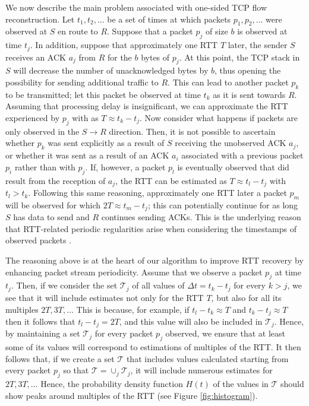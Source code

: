 %
%
We now describe the main problem associated with one-sided TCP flow reconstruction. Let $t_1, t_2, \ldots$ be a set of times at which packets $p_1, p_2, \ldots$ were observed at $S$ en route to $R$. Suppose that a packet $p_j$ of size $b$ is observed at time $t_j$. In addition, suppose that approximately one RTT $T$ later, the sender $S$ receives an ACK $a_j$ from $R$ for the $b$ bytes of $p_j$. At this point, the TCP stack in $S$ will decrease the number of unacknowledged bytes by $b$, thus opening the possibility for sending additional traffic to $R$. This can lead to another packet $p_k$ to be transmitted; let this packet be observed at time $t_k$ as it is sent towards $R$. Assuming that processing delay is insignificant, we can approximate the RTT experienced by $p_j$ with as $T \approx t_k - t_j$. Now consider what happens if packets are only observed in the $S \rightarrow R$ direction. Then, it is not possible to ascertain whether $p_k$ was sent explicitly as a result of $S$ receiving the unobserved 
ACK $a_j$, or whether it was sent as a result of an ACK $a_i$ associated with a previous packet $p_i$ rather than with $p_j$. If, however, a packet $p_l$ is eventually observed that did result from the 
reception of $a_j$, the RTT can be estimated as $T \approx t_l - t_j$ with $t_l > t_k$. Following this same reasoning, approximately one RTT later a packet $p_m$ will be observed for which $2T \approx t_m - t_j$; this can potentially continue for as long $S$ has data to send and $R$ continues sending ACKs. This is the underlying reason that RTT-related periodic regularities arise when considering the timestamps of observed packets \cite{Qian:2009p429}.

The reasoning above is at the heart of our algorithm to improve RTT recovery by enhancing packet stream periodicity. Assume that we observe a packet $p_j$ at time $t_j$. Then, if we consider the set $\mathcal{T}_j$ of all values of $\Delta t = t_k - t_j$ for every $k > j$, we see that it will include estimates not only for the RTT $T$, but also for all its multiples $2T, 3T, \ldots$ This is because, for example, if $t_l-t_k \approx T$ and $t_k - t_j \approx T$ then
it follows that $t_l - t_j = 2T$, and this value will also be included in $\mathcal{T}_j$. Hence, by maintaining a set $\mathcal{T}_j$ for every packet $p_j$ observed, we ensure that at least some of its values will correspond to estimations of multiples of the RTT. It then follows that, if we create a set $\mathcal{T}$ that includes values calculated starting from every packet $p_j$ so that $\mathcal{T} = \cup_j \mathcal{T}_j$, it will include numerous estimates for $2T, 3T, \ldots$ Hence, the probability density function $H(t)$ of the values in $\mathcal{T}$ should show peaks around multiples of the RTT (see Figure \ref{fig:histogram}). 

